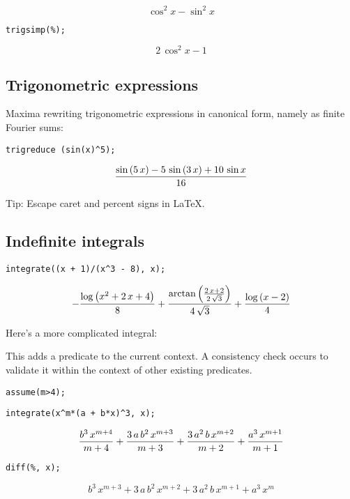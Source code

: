 \documentclass[a4paper,12pt]{article}
\begin{document}
\begin{equation}
\cos ^2x-\sin ^2x
\end{equation}


\texttt{trigsimp(\%);}

\begin{equation}
2\,\cos ^2x-1
\end{equation}

\subsection{Trigonometric expressions}
Maxima rewriting trigonometric expressions in canonical form, namely as finite
Fourier sums:

\texttt{trigreduce (sin(x)\^{}5);}

\begin{equation}
  {{\sin \left(5\,x\right)-5\,\sin \left(3\,x\right)+10\,\sin x
  }\over{16}}
\end{equation}

Tip: Escape caret and percent signs in \LaTeX{}.

\subsection{Indefinite integrals}

\texttt{integrate((x + 1)/(x\^{}3 - 8), x);}

\begin{equation}
-{{\log \left(x^2+2\,x+4\right)}\over{8}}+{{\arctan \left({{2\,x+2
 }\over{2\,\sqrt{3}}}\right)}\over{4\,\sqrt{3}}}+{{\log \left(x-2
 \right)}\over{4}}
\end{equation}

Here's a more complicated integral:

This adds a predicate to the current context. A consistency check occurs to
validate it within the context of other existing predicates.

\texttt{assume(m>4);}

\texttt{integrate(x\^{}m*(a + b*x)\^{}3, x);}

\begin{equation}
{{b^3\,x^{m+4}}\over{m+4}}+{{3\,a\,b^2\,x^{m+3}}\over{m+3}}+{{3\,a^
 2\,b\,x^{m+2}}\over{m+2}}+{{a^3\,x^{m+1}}\over{m+1}}
\end{equation}

\texttt{diff(\%, x);}

\begin{equation}
b^3\,x^{m+3}+3\,a\,b^2\,x^{m+2}+3\,a^2\,b\,x^{m+1}+a^3\,x^{m}
\end{equation}
\end{document}
